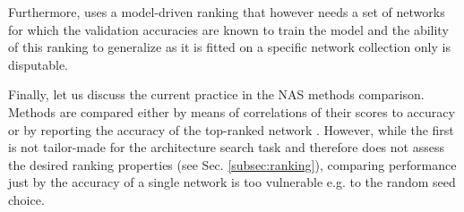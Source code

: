 Furthermore, \cite{kadlecova2024surprisingly} uses a model-driven ranking that however needs a set of networks for which the validation accuracies are known to train the model and the ability of this ranking to generalize as it is fitted on a specific network collection only is disputable.

Finally, let us discuss the current practice in the NAS methods comparison. Methods are compared either by means of correlations of their scores to accuracy or by reporting the accuracy of the top-ranked network \cite{lee2024az, li2023zico}. However, while the first is not tailor-made for the architecture search task and therefore does not assess the desired ranking properties (see Sec. \ref{subsec:ranking}), comparing performance just by the accuracy of a single network is too vulnerable e.g. to the random seed choice.  %
